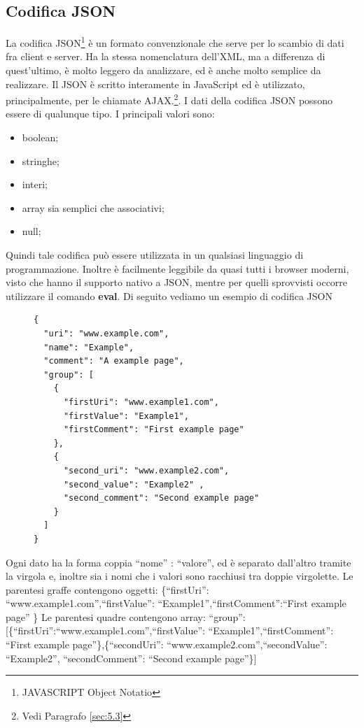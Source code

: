 \documentclass[a4paper,11pt]{article}
\begin{document}
\subsection{Codifica JSON}
\label{sec:5.2}
La codifica JSON\footnote{JAVASCRIPT Object Notatio} è un formato convenzionale che serve per lo scambio di dati fra client e server. Ha la stessa nomenclatura dell'XML, ma  a differenza di quest'ultimo, è molto leggero da analizzare, ed è anche molto semplice da realizzare.
Il JSON è scritto interamente in JavaScript ed è  utilizzato, principalmente, per le chiamate AJAX.\footnote{Vedi Paragrafo \ref{sec:5.3}}. I dati della codifica JSON possono essere di qualunque tipo. I principali valori sono:
\begin{itemize}
	\item boolean;
	\item stringhe;
	\item interi; 
	\item array sia semplici che associativi;
	\item null;
\end{itemize} 
Quindi tale codifica può essere utilizzata in un qualsiasi linguaggio di programmazione.
Inoltre è facilmente leggibile da quasi tutti i browser moderni, visto che hanno il supporto nativo a JSON, mentre per quelli sprovvisti occorre utilizzare il comando \textbf{eval}. \newline Di seguito vediamo un esempio di codifica JSON
	\begin{figure}[htb]
		\centering
		\begin{lstlisting}[language=HTML, basicstyle=\large]
{
  "uri": "www.example.com",
  "name": "Example",
  "comment": "A example page",
  "group": [
    {
      "firstUri": "www.example1.com",
      "firstValue": "Example1",
      "firstComment": "First example page"       
    },   
    {
      "second_uri": "www.example2.com",
      "second_value": "Example2" ,
      "second_comment": "Second example page"
    }
  ]
}
		\end{lstlisting}
 \end{figure}\newline
Ogni dato ha la forma coppia ``nome'' : ``valore'', ed è separato dall'altro tramite la virgola e, inoltre sia i nomi che i valori sono racchiusi tra doppie virgolette.\newline
Le parentesi graffe contengono oggetti: \newline \{``firstUri'': ``www.example1.com'',``firstValue'': ``Example1'',\newline ``firstComment'':``First example page''   \} \newline
Le parentesi quadre contengono array: \newline ``group'': [\{``firstUri'':``www.example1.com'',``firstValue'': ``Example1'',\newline ``firstComment'': ``First example page''\},\newline\{``secondUri'': ``www.example2.com'',``secondValue'': ``Example2'', \newline ``secondComment'': ``Second example page''\}]
\newpage
\end{document}
